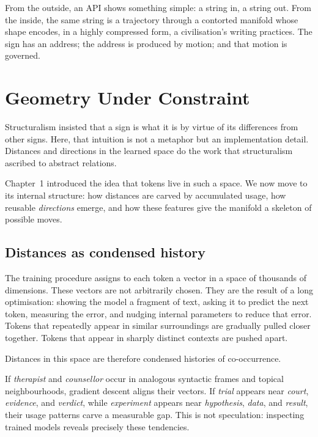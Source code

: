 \documentclass[12pt,a4paper]{book}
\begin{document}
From the outside, an API shows something simple: a string in, a string out. From the inside, the same string is a trajectory through a contorted manifold whose shape encodes, in a highly compressed form, a civilisation's writing practices. The sign has an address; the address is produced by motion; and that motion is governed.

\section{Geometry Under Constraint}

Structuralism insisted that a sign is what it is by virtue of its differences from other signs. Here, that intuition is not a metaphor but an implementation detail. Distances and directions in the learned space do the work that structuralism ascribed to abstract relations.

Chapter~1 introduced the idea that tokens live in such a space. We now move to its internal structure: how distances are carved by accumulated usage, how reusable \emph{directions} emerge, and how these features give the manifold a skeleton of possible moves.

\subsection*{Distances as condensed history}

The training procedure assigns to each token a vector in a space of thousands of dimensions. These vectors are not arbitrarily chosen. They are the result of a long optimisation: showing the model a fragment of text, asking it to predict the next token, measuring the error, and nudging internal parameters to reduce that error. Tokens that repeatedly appear in similar surroundings are gradually pulled closer together. Tokens that appear in sharply distinct contexts are pushed apart.

Distances in this space are therefore condensed histories of co-occurrence.

If \emph{therapist} and \emph{counsellor} occur in analogous syntactic frames and topical neighbourhoods, gradient descent aligns their vectors. If \emph{trial} appears near \emph{court}, \emph{evidence}, and \emph{verdict}, while \emph{experiment} appears near \emph{hypothesis}, \emph{data}, and \emph{result}, their usage patterns carve a measurable gap. This is not speculation: inspecting trained models reveals precisely these tendencies.
\end{document}
